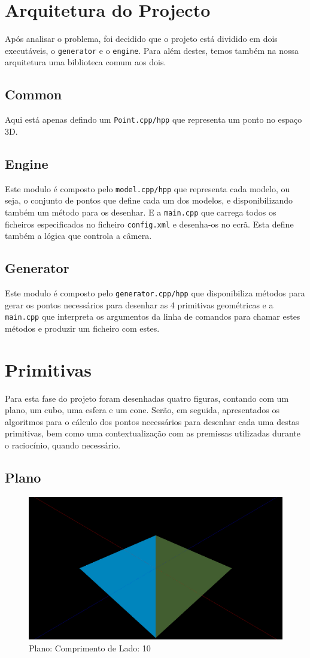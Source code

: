 \documentclass[a4paper]{article}
\begin{document}
\section{Arquitetura do Projecto}
Após analisar o problema, foi decidido que o projeto está dividido em dois executáveis, o \texttt{generator} e o \texttt{engine}. Para além destes, temos também na nossa arquitetura uma biblioteca comum aos dois.

\subsection{Common}

Aqui está apenas defindo um \texttt{Point.cpp/hpp} que representa um ponto no espaço 3D.

\subsection{Engine}

Este modulo é composto pelo \texttt{model.cpp/hpp} que representa cada modelo, ou seja, o conjunto de pontos que define cada um dos modelos, e disponibilizando também um método para os desenhar. E a \texttt{main.cpp} que carrega todos os ficheiros especificados no ficheiro \texttt{config.xml} e desenha-os no ecrã. Esta define também a lógica que controla a câmera.

\subsection{Generator}

Este modulo é composto pelo \texttt{generator.cpp/hpp} que disponibiliza métodos para gerar os pontos necessários para desenhar as 4 primitivas geométricas e a \texttt{main.cpp} que interpreta os argumentos da linha de comandos para chamar estes métodos e produzir um ficheiro com estes.

\section{Primitivas}
 Para esta fase do projeto foram desenhadas quatro figuras, contando com um plano, um cubo, uma esfera e um cone. Serão, em seguida, apresentados os algoritmos para o cálculo dos pontos necessários para desenhar cada uma destas primitivas, bem como uma contextualização com as premissas utilizadas durante o raciocínio, quando necessário.
\subsection{Plano}
\begin{figure}[H]
\centering
\includegraphics[width=0.5\linewidth]{plane.png}
\caption{Plano: Comprimento de Lado: 10}
\end{figure}
\end{document}
